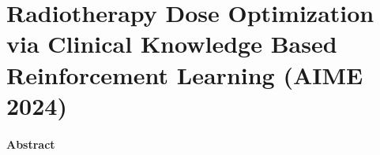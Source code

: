 \section{Radiotherapy Dose Optimization via Clinical Knowledge Based Reinforcement Learning (AIME 2024)}
\paragraph{Abstract}
%

